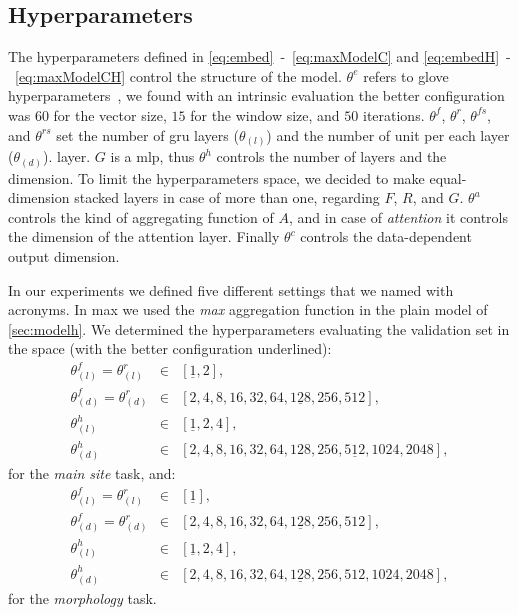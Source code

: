 \subsection{Hyperparameters}
The hyperparameters defined in \eqref{eq:embed}~-~\eqref{eq:maxModelC}
and \eqref{eq:embedH}~-~\eqref{eq:maxModelCH} control the structure of
the model. $\theta^e$ refers to \ac{glove}
hyperparameters~\cite{pennington_glove:_2014}, we found with an
intrinsic evaluation the better configuration was $60$ for the vector
size, $15$ for the window size, and $50$ iterations. $\theta^f$,
$\theta^r$, $\theta^{fs}$, and $\theta^{rs}$ set the number of
\ac{gru} layers ($\theta_{(l)}$) and the number of unit per each layer
($\theta_{(d)}$). 
layer. $G$ is a \ac{mlp}, thus $\theta^h$ controls the number of
layers and the dimension. To limit the
hyperparameters space, we decided to
make equal-dimension stacked layers in case of more than one,
regarding $F$, $R$, and $G$. $\theta^a$ controls the
kind of aggregating function of $A$, and in case of \emph{attention}
it controls the dimension of the attention layer. Finally $\theta^c$ controls the
data-dependent output dimension.

In our experiments we defined five different settings that we named
with acronyms. In \ac{max} we used the \emph{max} aggregation function
in the plain model of \cref{sec:modelh}. We determined the
hyperparameters evaluating the validation set in the space (with the
better configuration underlined):
\begin{align*}
  \theta_{(l)}^f=\theta_{(l)}^r&\in&[\underline{1},2],\\
  \theta_{(d)}^f=\theta_{(d)}^r&\in&[2,4,8,16,32,64,\underline{128},256,512],\\
  \theta_{(l)}^h&\in&[\underline{1},2,4],\\
  \theta_{(d)}^h&\in&[2,4,8,16,32,64,128,256,\underline{512},1024,2048],
\end{align*}
for the \emph{main site} task, and:
\begin{align*}
  \theta_{(l)}^f=\theta_{(l)}^r&\in&[\underline{1}],\\
  \theta_{(d)}^f=\theta_{(d)}^r&\in&[2,4,8,16,32,64,\underline{128},256,512],\\
  \theta_{(l)}^h&\in&[\underline{1},2,4],\\
  \theta_{(d)}^h&\in&[2,4,8,16,32,64,\underline{128},256,512,1024,2048],
\end{align*}
for the \emph{morphology} task.

